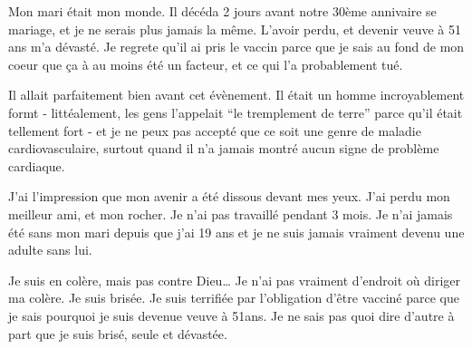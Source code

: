 {Mon mari était mon monde. Il décéda 2 jours avant notre 30ème annivaire se mariage, et je ne serais plus jamais la même. L'avoir perdu, et devenir veuve à 51 ans m'a dévasté. Je regrete qu'il ai pris le vaccin parce que je sais au fond de mon coeur que ça à au moins été un facteur, et ce qui l'a probablement tué.

Il allait parfaitement bien avant cet évènement. Il était un homme incroyablement formt - littéalement, les gens l'appelait “le tremplement de terre” parce qu'il était tellement fort - et je ne peux pas accepté que ce soit une genre de maladie cardiovasculaire, surtout quand il n'a jamais montré aucun signe de problème cardiaque.

J'ai l'impression que mon avenir a été dissous devant mes yeux. J'ai perdu mon meilleur ami, et mon rocher. Je n'ai pas travaillé pendant 3 mois. Je n'ai jamais été sans mon mari depuis que j'ai 19 ans et je ne suis jamais vraiment devenu une adulte sans lui.

Je suis en colère, mais pas contre Dieu… Je n'ai pas vraiment d'endroit où diriger ma colère. Je suis brisée. Je suis terrifiée par l'obligation d'être vacciné parce que je sais pourquoi je suis devenue veuve à 51ans. Je ne sais pas quoi dire d'autre à part que je suis brisé, seule et dévastée.

}
